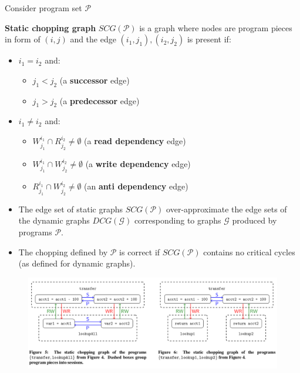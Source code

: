 \documentclass{beamer}
\begin{document}
\begin{frame}
	Consider program set $\mathcal{P}$
	\begin{definition}
		
		\textbf{Static chopping graph} $SCG(\mathcal{P})$ is a graph where nodes are program pieces in form of $(i, j)$ and the edge $(i_1, j_1), (i_2, j_2)$ is present if:
		\begin{itemize}
			\item $i_1 = i_2$ and:
			\begin{itemize}
				\item $j_1 < j_2$ (a \textbf{successor} edge)
				\item $j_1 > j_2$ (a \textbf{predecessor} edge)
			\end{itemize}
			\item $i_1 \ne i_2$ and:
			\begin{itemize}
				\item $W^{i_1}_{j_1}\cap R^{i_2}_{j_2} \ne \emptyset$ (a \textbf{read dependency} edge)
				\item $W^{i_1}_{j_1}\cap W^{i_2}_{j_2} \ne \emptyset$ (a \textbf{write dependency} edge)
				\item $R^{i_1}_{j_1}\cap W^{i_2}_{j_2} \ne \emptyset$ (an \textbf{anti dependency} edge)
			\end{itemize}
		\end{itemize}
	\end{definition}
\end{frame}

\begin{frame}
	\begin{itemize}
		\item The edge set of static graphs $SCG(\mathcal{P})$ over-approximate the edge sets of the dynamic graphs $DCG(\mathcal{G})$ corresponding to graphs $\mathcal{G}$ produced by programs $\mathcal{P}$.
		\item The chopping defined by $\mathcal{P}$ is correct if $SCG(\mathcal{P})$ contains no critical cycles (as defined for dynamic graphs).
	\end{itemize}
\end{frame}

\begin{frame}
	\begin{figure}
		\includegraphics[scale=0.28]{fig56}
	\end{figure}
\end{frame}
\end{document}
